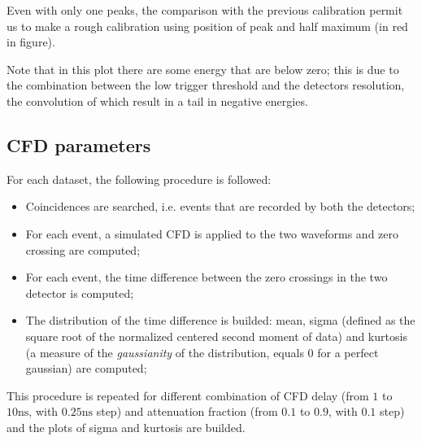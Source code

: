 \documentclass[11pt,a4 paper]{article}
\begin{document}
Even with only one peaks, the comparison with the previous calibration permit us to make a rough calibration using position of peak and half maximum (in red in figure).

Note that in this plot there are some energy that are below zero; this is due to the combination between the low trigger threshold and the detectors resolution, the convolution of which result in a tail in negative energies.

\subsection{CFD parameters}
For each dataset, the following procedure is followed:
\begin{itemize}[noitemsep]
    \item Coincidences are searched, i.e. events that are recorded by both the detectors;
    \item For each event, a simulated CFD is applied to the two waveforms and zero crossing are computed;
    \item For each event, the time difference between the zero crossings in the two detector is computed;
    \item The distribution of the time difference is builded: mean, sigma (defined as the square root of the normalized centered second moment of data) and kurtosis (a measure of the \emph{gaussianity} of the distribution, equals $0$ for a perfect gaussian) are computed;
\end{itemize}
This procedure is repeated for different combination of CFD delay (from $1$ to $10\si{\nano\second}$, with $0.25\si{\nano\second}$ step) and attenuation fraction (from $0.1$ to $0.9$, with $0.1$ step) and the plots of sigma and kurtosis are builded.
\end{document}
